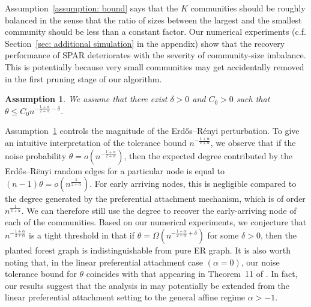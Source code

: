 \documentclass[twoside,11pt]{article}
\newtheorem{assumption}[theorem]{Assumption}
\theoremstyle{remark}
\begin{document}
Assumption~\ref{assumption: bound} says that the $K$ communities should be roughly balanced in the sense that the ratio of sizes between the largest and the smallest community should be less than a constant factor. Our numerical experiments (c.f. Section~\ref{sec: additional simulation} in the appendix) show that the recovery performance of SPAR deteriorates with the severity of community-size imbalance. This is potentially because very small communities may get accidentally removed in the first pruning stage of our algorithm. 



\begin{assumption}
\label{assumption: sparsity}
We assume that there exist $\delta > 0$ and $C_0 > 0$ such that $\theta \leq C_0 n^{-\frac{1+\alpha}{2+\alpha}-\delta}$.
\end{assumption}

Assumption~\ref{assumption: sparsity} controls the magnitude of the Erd\H{o}s--R\'enyi perturbation. To give an intuitive interpretation of the tolerance bound $n^{ - \frac{1+\alpha}{2+\alpha}}$, we observe that if the noise probability $\theta = o(n^{ - \frac{1+\alpha}{2+\alpha}})$, then the expected degree contributed by the Erd\H{o}s--R\"{e}nyi random edges for a particular node is equal to $(n-1)\theta
=o(n^{\frac{1}{2+\alpha}})$. For early arriving nodes, this is negligible compared to the degree generated by the preferential attachment mechanism, which is of order $n^{\frac{1}{2+\alpha}}$. We can therefore still use the degree to recover the early-arriving node of each of the communities. Based on our numerical experiments, we conjecture that $n^{-\frac{1+\alpha}{2+\alpha}}$ is a tight threshold in that if $\theta = \Omega(n^{-\frac{1+\alpha}{2+\alpha} + \delta})$ for some $\delta > 0$, then the planted forest graph is indistinguishable from pure ER graph. It is also worth noting that, in the linear preferential attachment case $(\alpha=0)$, our noise tolerance bound for $\theta$ coincides with that appearing in Theorem~11 of \cite{crane2024root}.
In fact, our results suggest that the analysis in \cite{crane2024root} may potentially be extended from the linear preferential attachment setting to the general affine regime $\alpha>-1$.
\end{document}
